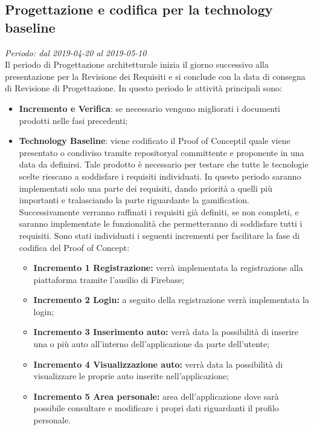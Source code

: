 \subsection{Progettazione e codifica per la technology baseline}
\textit{Periodo: dal 2019-04-20 al 2019-05-10} \\
Il periodo di Progettazione architetturale inizia il giorno successivo alla presentazione per la Revisione dei Requisiti e si conclude con la data di consegna di Revisione di 
Progettazione. In questo periodo le attività principali sono:
\begin{itemize}
	\item \textbf{Incremento e Verifica}: se necessario vengono migliorati i 
	documenti prodotti nelle fasi precedenti;
	\item \textbf{Technology Baseline\glo}: viene codificato il Proof of Concept\glosp il quale viene presentato o condiviso tramite repository\glosp al committente e proponente in una data da definirsi. Tale prodotto è necessario per testare che tutte le tecnologie scelte riescano a soddisfare i requisiti individuati. In questo periodo saranno implementati solo una parte dei requisiti, dando priorità a quelli più importanti e tralasciando la parte riguardante la gamification\glo. Successivamente verranno raffinati i requisiti già definiti, se non completi, e saranno implementate le funzionalità che permetteranno di soddisfare tutti i requisiti.
	Sono stati individuati i seguenti incrementi per facilitare la fase di codifica del Proof of Concept\glo:
	\begin{itemize}
		\item \textbf{Incremento 1 Registrazione:} verrà implementata la registrazione alla piattaforma tramite l'ausilio di Firebase\glo;
		\item \textbf{Incremento 2 Login:} a seguito della registrazione verrà implementata la login;
		\item \textbf{Incremento 3 Inserimento auto:} verrà data la possibilità di inserire una o più auto all'interno dell'applicazione da parte dell'utente;
		\item \textbf{Incremento 4 Visualizzazione auto:} verrà data la possibilità di visualizzare le proprie auto inserite nell'applicazione;
		\item \textbf{Incremento 5 Area personale:} area dell'applicazione dove sarà possibile consultare e modificare i propri dati riguardanti il profilo personale.
		
		
	\end{itemize}
		
\end{itemize}

